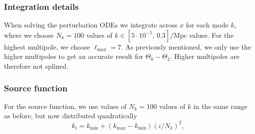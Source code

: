 \subsubsection{Integration details } \label{sssec:M3:implementations:integration_details}

When solving the perturbation ODEs we integrate across $x$ for each mode $k$, where we choose $N_k=100$ values of $k\in[5\cdot10^{-5},\,0.3]/\mathrm{Mpc}$ values. For the highest multipole, we choose $\ell_\mathrm{max}=7$. As previously mentioned, we only use the higher multipoles to get an accurate result for $\Theta_0-\Theta_2$. Higher multipoles are therefore not splined.     


\subsubsection{Source function} \label{sssec:M3:implementations:source_function}
For the source function, we use values of $N_k=100$ values of $k$ in the same range as before, but now distributed quadratically 
\begin{equation} \label{eq:M3:implementations:k_distribution_for_source_function}
    k_i = k_\mathrm{min} + (k_\mathrm{max} - k_\mathrm{min})(i/N_k)^2,
\end{equation}